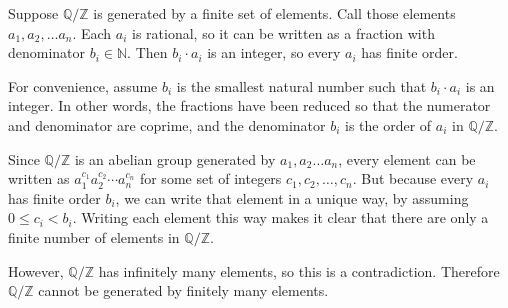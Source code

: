 \documentclass[12pt]{article}
\begin{document}
Suppose $ \mathbb{Q} / \mathbb{Z} $ is generated by a finite set of elements. Call those elements $a_1, a_2, \dots a_n$. Each $a_i$ is rational, so it can be written as a fraction with denominator $b_i \in \mathbb{N}$. Then $b_i \cdot a_i$ is an integer, so every $a_i$ has finite order.
\par
For convenience, assume $b_i$ is the smallest natural number such that $b_i \cdot a_i$ is an integer. In other words, the fractions have been reduced so that the numerator and denominator are coprime, and the denominator $b_i$ is the order of $a_i$ in $ \mathbb{Q} / \mathbb{Z} $.
\par
Since $ \mathbb{Q} / \mathbb{Z} $ is an abelian group generated by $a_1, a_2 \dots a_n$, every element can be written as $a_1^{c_1} a_2^{c_2} \cdots a_n^{c_n}$ for some set of integers $c_1, c_2, \dots, c_n$. But because every $a_i$ has finite order $b_i$, we can write that element in a unique way, by assuming $0 \leq c_i < b_i$. Writing each element this way makes it clear that there are only a finite number of elements in $ \mathbb{Q} / \mathbb{Z} $.
\par
However, $ \mathbb{Q} / \mathbb{Z} $ has infinitely many elements, so this is a contradiction. Therefore $ \mathbb{Q} / \mathbb{Z} $ cannot be generated by finitely many elements.

\section{}
\noindent{}\bigskip
\end{document}

